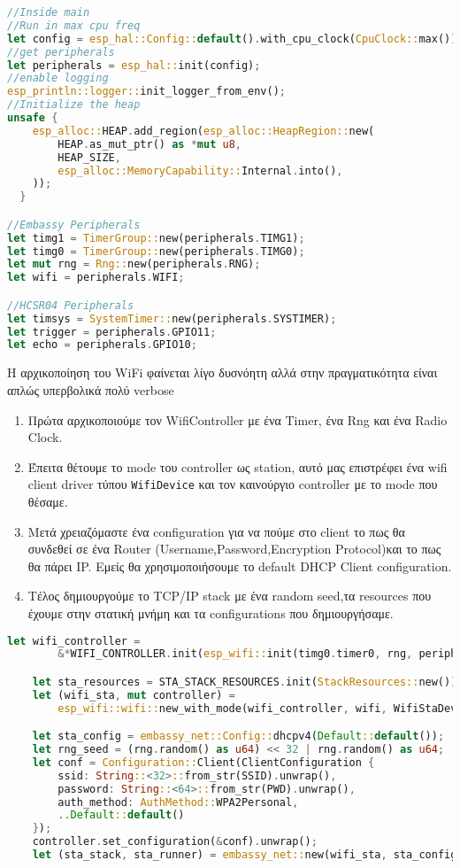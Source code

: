 \begin{lstlisting}[language=Rust]
//Inside main
//Run in max cpu freq
let config = esp_hal::Config::default().with_cpu_clock(CpuClock::max());
//get peripherals
let peripherals = esp_hal::init(config);
//enable logging
esp_println::logger::init_logger_from_env();
//Initialize the heap
unsafe {
    esp_alloc::HEAP.add_region(esp_alloc::HeapRegion::new(
        HEAP.as_mut_ptr() as *mut u8,
        HEAP_SIZE,
        esp_alloc::MemoryCapability::Internal.into(),
    ));
  }

//Embassy Peripherals
let timg1 = TimerGroup::new(peripherals.TIMG1);
let timg0 = TimerGroup::new(peripherals.TIMG0);
let mut rng = Rng::new(peripherals.RNG);
let wifi = peripherals.WIFI;

//HCSR04 Peripherals
let timsys = SystemTimer::new(peripherals.SYSTIMER);
let trigger = peripherals.GPIO11;
let echo = peripherals.GPIO10;
\end{lstlisting}

Η αρχικοποίηση του WiFi φαίνεται λίγο δυσνόητη αλλά
στην πραγματικότητα είναι απλώς υπερβολικά πολύ verbose

\begin{enumerate}
\item Πρώτα αρχικοποιούμε τον WifiController με ένα
  Timer, ένα Rng και ένα Radio Clock.
\item Έπειτα θέτουμε το mode του controller ως station, αυτό
  μας επιστρέφει ένα wifi client driver τύπου \verb|WifiDevice|
  και τον καινούργιο controller με το mode που θέσαμε.
\item Μετά χρειαζόμαστε ένα configuration για να πούμε στο client το
πως θα συνδεθεί σε ένα Router (Username,Password,Encryption
Protocol)και το πως θα πάρει IP. Εμείς θα χρησιμοποιήσουμε το default
DHCP Client configuration.
\item Τέλος δημιουργούμε το TCP/IP stack με ένα random seed,τα
  resources που έχουμε στην στατική μνήμη και τα configurations που
  δημιουργήσαμε. 
\end{enumerate}

\begin{lstlisting}[language=Rust]
    let wifi_controller =
        &*WIFI_CONTROLLER.init(esp_wifi::init(timg0.timer0, rng, peripherals.RADIO_CLK).unwrap());

    let sta_resources = STA_STACK_RESOURCES.init(StackResources::new());
    let (wifi_sta, mut controller) =
        esp_wifi::wifi::new_with_mode(wifi_controller, wifi, WifiStaDevice).unwrap();

    let sta_config = embassy_net::Config::dhcpv4(Default::default());
    let rng_seed = (rng.random() as u64) << 32 | rng.random() as u64;
    let conf = Configuration::Client(ClientConfiguration {
        ssid: String::<32>::from_str(SSID).unwrap(),
        password: String::<64>::from_str(PWD).unwrap(),
        auth_method: AuthMethod::WPA2Personal,
        ..Default::default()
    });
    controller.set_configuration(&conf).unwrap();
    let (sta_stack, sta_runner) = embassy_net::new(wifi_sta, sta_config, sta_resources, rng_seed);
\end{lstlisting}

